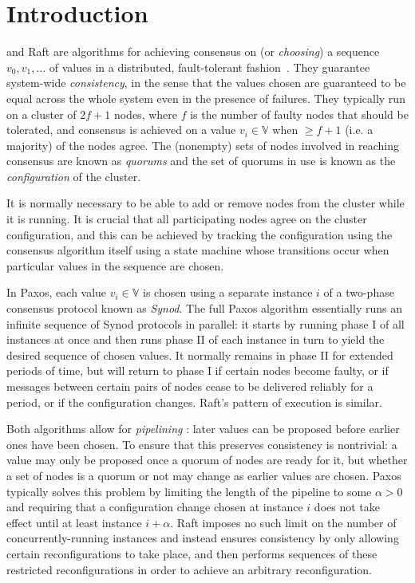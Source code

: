 \documentclass[journal]{IEEEtran}
\begin{document}
\section{Introduction}

 and Raft are algorithms for achieving consensus on (or
\textit{choosing}) a sequence $v_0, v_1, \ldots$ of values in a distributed,
fault-tolerant fashion~\cite{part-time-parliament}. They guarantee system-wide
\textit{consistency}, in the sense that the values chosen are guaranteed to be
equal across the whole system even in the presence of failures. They typically
run on a cluster of $2f+1$ nodes, where $f$ is the number of faulty nodes that
should be tolerated, and consensus is achieved on a value $v_i \in \mathbb V$
when $\ge f+1$ (i.e. a majority) of the nodes agree. The (nonempty) sets of
nodes involved in reaching consensus are known as \textit{quorums} and the set
of quorums in use is known as the \textit{configuration} of the cluster.


It is normally necessary to be able to add or remove nodes from the cluster
while it is running. It is crucial that all participating nodes agree on the
cluster configuration, and this can be achieved by tracking the configuration
using the consensus algorithm itself using a state machine whose transitions
occur when particular values in the sequence are chosen.

In Paxos, each value $v_i \in \mathbb V$ is chosen using a separate instance
$i$ of a two-phase consensus protocol known as \textit{Synod}. The full Paxos
algorithm essentially runs an infinite sequence of Synod protocols in parallel:
it starts by running phase I of all instances at once and then runs phase II of
each instance in turn to yield the desired sequence of chosen values. It
normally remains in phase II for extended periods of time, but will return to
phase I if certain nodes become faulty, or if messages between certain pairs of
nodes cease to be delivered reliably for a period, or if the configuration
changes. Raft's pattern of execution is similar.

Both algorithms allow for \textit{pipelining} \cite{smart}: later values can be
proposed before earlier ones have been chosen. To ensure that this preserves
consistency is nontrivial: a value may only be proposed once a quorum of nodes
are ready for it, but whether a set of nodes is a quorum or not may change as
earlier values are chosen. Paxos typically solves this problem by limiting the
length of the pipeline to some $\alpha > 0$ and requiring that a configuration
change chosen at instance $i$ does not take effect until at least instance $i +
\alpha$.  Raft imposes no such limit on the number of concurrently-running
instances and instead ensures consistency by only allowing certain
reconfigurations to take place, and then performs sequences of these restricted
reconfigurations in order to achieve an arbitrary reconfiguration.
\end{document}
